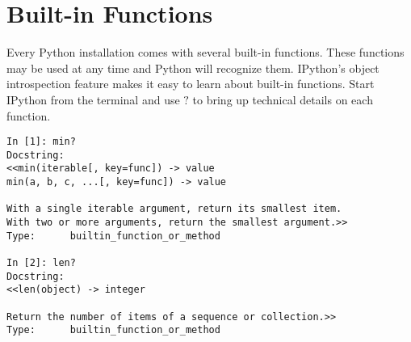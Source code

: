 \label{lab:Standard Library}

\section*{Built-in Functions}

Every Python installation comes with several built-in functions.
These functions may be used at any time and Python will recognize them.
IPython's object introspection feature makes it easy to learn about built-in functions.
Start IPython from the terminal and use $?$ to bring up technical details on each function.

\begin{lstlisting}
In [1]: min?
Docstring:
<<min(iterable[, key=func]) -> value
min(a, b, c, ...[, key=func]) -> value

With a single iterable argument, return its smallest item.
With two or more arguments, return the smallest argument.>>
Type:      builtin_function_or_method

In [2]: len?
Docstring:
<<len(object) -> integer

Return the number of items of a sequence or collection.>>
Type:      builtin_function_or_method
\end{lstlisting}

